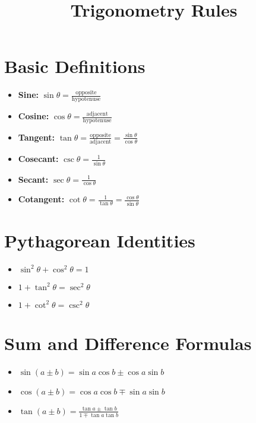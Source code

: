 \documentclass[a4paper,12pt]{article}
\begin{document}
\title{Trigonometry Rules}
\author{}
\date{}
\maketitle

\section*{Basic Definitions}
\begin{itemize}
    \item \textbf{Sine:} \(\sin \theta = \frac{\text{opposite}}{\text{hypotenuse}}\)
    \item \textbf{Cosine:} \(\cos \theta = \frac{\text{adjacent}}{\text{hypotenuse}}\)
    \item \textbf{Tangent:} \(\tan \theta = \frac{\text{opposite}}{\text{adjacent}} = \frac{\sin \theta}{\cos \theta}\)
    \item \textbf{Cosecant:} \(\csc \theta = \frac{1}{\sin \theta}\)
    \item \textbf{Secant:} \(\sec \theta = \frac{1}{\cos \theta}\)
    \item \textbf{Cotangent:} \(\cot \theta = \frac{1}{\tan \theta} = \frac{\cos \theta}{\sin \theta}\)
\end{itemize}

\section*{Pythagorean Identities}
\begin{itemize}
    \item \(\sin^2 \theta + \cos^2 \theta = 1\)
    \item \(1 + \tan^2 \theta = \sec^2 \theta\)
    \item \(1 + \cot^2 \theta = \csc^2 \theta\)
\end{itemize}

\section*{Sum and Difference Formulas}
\begin{itemize}
    \item \(\sin(a \pm b) = \sin a \cos b \pm \cos a \sin b\)
    \item \(\cos(a \pm b) = \cos a \cos b \mp \sin a \sin b\)
    \item \(\tan(a \pm b) = \frac{\tan a \pm \tan b}{1 \mp \tan a \tan b}\)
\end{itemize}
\end{document}
